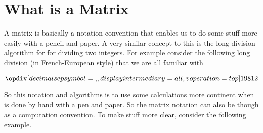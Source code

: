 \section{What is a Matrix}

A matrix is basically a notation convention that enables us to do some stuff more easily with a pencil and paper.  A very similar concept to this is the long division algorithm for for dividing two integers. For example consider the following long division (in French-European style) that we are all familiar with

\begin{equation*}
	\opdiv[decimalsepsymbol={,},displayintermediary=all,voperation=top]
	{198}{12}
\end{equation*}

So this notation and algorithms is to use some calculations more continent when is done by hand with a pen and paper. So the matrix notation can also be though as a computation convention. To make stuff more clear, consider the following example. \newline

